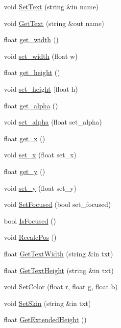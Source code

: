 \begin{DoxyCompactItemize}
\item 
void \hyperlink{class_g_u_i_edit_box_a81739450f27d78e39368985b4581e12f}{Set\+Text} (string \&in name)
\item 
void \hyperlink{class_g_u_i_edit_box_a5a362705212d4106b49bcb913b098bf9}{Get\+Text} (string \&out name)
\item 
float \hyperlink{class_g_u_i_edit_box_a4cbbaeba736012561070ea18219f0e36}{get\+\_\+width} ()
\item 
void \hyperlink{class_g_u_i_edit_box_a3820d5b7ab4deb52e9c70ea3231e12a6}{set\+\_\+width} (float w)
\item 
float \hyperlink{class_g_u_i_edit_box_a4161c41286830b059e7dac7245b521fd}{get\+\_\+height} ()
\item 
void \hyperlink{class_g_u_i_edit_box_a7744ada92160ee310fd82bc83503c63d}{set\+\_\+height} (float h)
\item 
float \hyperlink{class_g_u_i_edit_box_a04246e48c971025bab5810eddb463b32}{get\+\_\+alpha} ()
\item 
void \hyperlink{class_g_u_i_edit_box_aa43c0b54f46133d3fd54ff6684ea9ff8}{set\+\_\+alpha} (float set\+\_\+alpha)
\item 
float \hyperlink{class_g_u_i_edit_box_ab0b3ca6eae9ba38ebf7acf138d5da169}{get\+\_\+x} ()
\item 
void \hyperlink{class_g_u_i_edit_box_a1d8242676575f6c05e70150c734d94c0}{set\+\_\+x} (float set\+\_\+x)
\item 
float \hyperlink{class_g_u_i_edit_box_a6dfca75d45a5e3c43aa5ba2be6a5143a}{get\+\_\+y} ()
\item 
void \hyperlink{class_g_u_i_edit_box_a9490c2379e29ff6409694369bdbc0f10}{set\+\_\+y} (float set\+\_\+y)
\item 
void \hyperlink{class_g_u_i_edit_box_a7e269748d9dc59e06f24fd0e9065df5a}{Set\+Focused} (bool set\+\_\+focused)
\item 
bool \hyperlink{class_g_u_i_edit_box_acf10d8dee3af3214741f6cab271e5c61}{Is\+Focused} ()
\item 
void \hyperlink{class_g_u_i_edit_box_ad7569728a2a27a3eadd35eb607b2e0c7}{Recalc\+Pos} ()
\item 
float \hyperlink{class_g_u_i_edit_box_ab96661c74aabebfe0c3f1bd91b18f43b}{Get\+Text\+Width} (string \&in txt)
\item 
float \hyperlink{class_g_u_i_edit_box_abe03092a77e9a1d174ec2b4451c099d2}{Get\+Text\+Height} (string \&in txt)
\item 
void \hyperlink{class_g_u_i_edit_box_a5f3dda8a65878491098353c493089c94}{Set\+Color} (float r, float g, float b)
\item 
void \hyperlink{class_g_u_i_edit_box_a4da1ea739fdaca6aae9a06d1d2f8749b}{Set\+Skin} (string \&in txt)
\item 
float \hyperlink{class_g_u_i_edit_box_a659968b0b08739118f210135d7b51e65}{Get\+Extended\+Height} ()
\end{DoxyCompactItemize}
